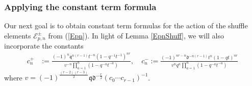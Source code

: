 \documentclass{amsart}
\newcommand{\qqq}{\mathfrak{q}}
\newcommand{\ddd}{\mathfrak{d}}
\theoremstyle{remark}
\numberwithin{thm}{section}
\numberwithin{equation}{section}
\begin{document}
\subsubsection{Applying the constant term formula}\label{ConstEF}

Our next goal is to obtain constant term formulas for the action of the shuffle elements $\mathcal{E}_{p,n}^\pm$ from (\ref{Epn}). In light of Lemma \ref{EpnShuff}, we will also incorporate the constants
\begin{align*}
c_{n}^+&:=\frac{(-1)^{n}\qqq^{n(r-1)}t^{-n}(1-q^{-1}t^{-1})^{nr}}{v^{-n}\prod_{a=1}^n(1-q^{-a}t^{-a})},\quad c_{n}^-:=\frac{(-1)^{nr-n}\ddd^{-n(r-1)}t^n(1-qt)^{nr}}{v^{n}q^n\prod_{a=1}^n(1-q^{-a}t^{-a})}
\end{align*}
where $v=(-1)^{\frac{(r-2)(r-3)}{2}}\qqq\ddd^{-\frac{r}{2}}(c_0\cdots c_{r-1})^{-1}$.
\end{document}
